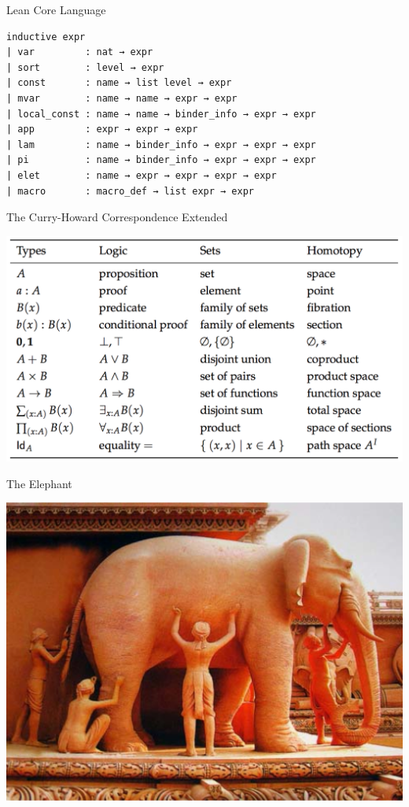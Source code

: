 \documentclass[pdf]{beamer}
\begin{document}
\begin{frame}[fragile]{Lean Core Language}
  \begin{verbatim}
inductive expr
| var         : nat → expr
| sort        : level → expr
| const       : name → list level → expr
| mvar        : name → name → expr → expr
| local_const : name → name → binder_info → expr → expr
| app         : expr → expr → expr
| lam         : name → binder_info → expr → expr → expr
| pi          : name → binder_info → expr → expr → expr
| elet        : name → expr → expr → expr → expr
| macro       : macro_def → list expr → expr
  \end{verbatim}
\end{frame}

\begin{frame}{The Curry-Howard Correspondence Extended\footnotemark[4]}
  \begin{center}
    \includegraphics[scale=0.47]{images/hott}
  \end{center}
\end{frame}

\begin{frame}{The Elephant}
  \begin{center}
    \includegraphics[scale=0.28]{images/elephant}
  \end{center}
\end{frame}
\end{document}

